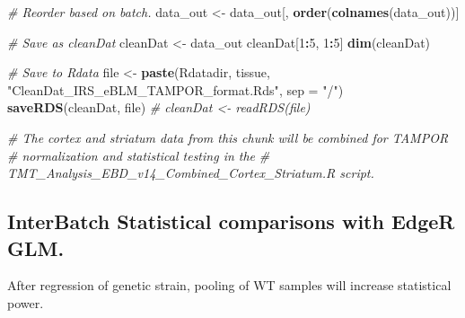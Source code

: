 \documentclass[]{article}
\newenvironment{Shaded}{\begin{snugshade}}{\end{snugshade}}
\newcommand{\KeywordTok}[1]{\textcolor[rgb]{0.13,0.29,0.53}{\textbf{#1}}}
\newcommand{\DataTypeTok}[1]{\textcolor[rgb]{0.13,0.29,0.53}{#1}}
\newcommand{\DecValTok}[1]{\textcolor[rgb]{0.00,0.00,0.81}{#1}}
\newcommand{\StringTok}[1]{\textcolor[rgb]{0.31,0.60,0.02}{#1}}
\newcommand{\CommentTok}[1]{\textcolor[rgb]{0.56,0.35,0.01}{\textit{#1}}}
\newcommand{\OperatorTok}[1]{\textcolor[rgb]{0.81,0.36,0.00}{\textbf{#1}}}
\newcommand{\NormalTok}[1]{#1}
\begin{document}
\begin{Shaded}
\begin{Highlighting}[]
\CommentTok{# Reorder based on batch.}
\NormalTok{data_out <-}\StringTok{ }\NormalTok{data_out[, }\KeywordTok{order}\NormalTok{(}\KeywordTok{colnames}\NormalTok{(data_out))]}

\CommentTok{# Save as cleanDat}
\NormalTok{cleanDat <-}\StringTok{ }\NormalTok{data_out}
\NormalTok{cleanDat[}\DecValTok{1}\OperatorTok{:}\DecValTok{5}\NormalTok{, }\DecValTok{1}\OperatorTok{:}\DecValTok{5}\NormalTok{]}
\KeywordTok{dim}\NormalTok{(cleanDat)}

\CommentTok{# Save to Rdata}
\NormalTok{file <-}\StringTok{ }\KeywordTok{paste}\NormalTok{(Rdatadir, tissue, }\StringTok{"CleanDat_IRS_eBLM_TAMPOR_format.Rds"}\NormalTok{, }\DataTypeTok{sep =} \StringTok{"/"}\NormalTok{)}
\KeywordTok{saveRDS}\NormalTok{(cleanDat, file)}
\CommentTok{# cleanDat <- readRDS(file)}

\CommentTok{# The cortex and striatum data from this chunk will be combined for TAMPOR}
\CommentTok{# normalization and statistical testing in the}
\CommentTok{# TMT_Analysis_EBD_v14_Combined_Cortex_Striatum.R script.}
\end{Highlighting}
\end{Shaded}

\subsection{InterBatch Statistical comparisons with EdgeR
GLM.}\label{interbatch-statistical-comparisons-with-edger-glm.}

After regression of genetic strain, pooling of WT samples will increase
statistical power.
\end{document}
